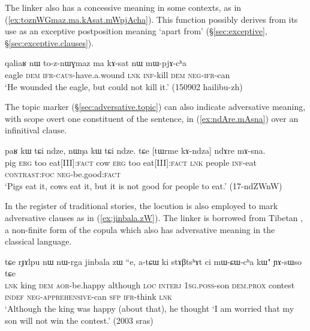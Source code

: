  The linker  also has a concessive meaning in some contexts, as in (\ref{ex:toznWGmaz.ma.kAsat.mWpjAcha}). This function possibly derives from its use as an exceptive postposition meaning `apart from' (§\ref{sec:exceptive}, §\ref{sec:exceptive.clauses}).
 
\begin{exe}
\ex \label{ex:toznWGmaz.ma.kAsat.mWpjAcha}
\gll qaliaʁ nɯ to-z-nɯɣmaz ma kɤ-sat nɯ mɯ-pjɤ-cʰa\\
eagle \textsc{dem} \textsc{ifr}-\textsc{caus}-have.a.wound \textsc{lnk} \textsc{inf}-kill \textsc{dem} \textsc{neg}-\textsc{ifr}-can\\
\glt `He wounded the eagle, but could not kill it.' (150902 hailibu-zh)
\end{exe}  
 
The topic marker  (§\ref{sec:adversative.topic}) can also indicate adversative meaning, with scope overt one constituent of the sentence, in (\ref{ex:ndAre.mAsna}) over an infinitival clause.
 
\begin{exe}
\ex \label{ex:ndAre.mAsna}
\gll paʁ kɯ tɕi ndze, nɯŋa kɯ tɕi ndze. tɕe [tɯrme kɤ-ndza] ndɤre mɤ-sna.   \\
pig \textsc{erg} too eat[III]:\textsc{fact} cow  \textsc{erg} too eat[III]:\textsc{fact} \textsc{lnk} people \textsc{inf}-eat  \textsc{contrast}:\textsc{foc}  \textsc{neg}-be.good:\textsc{fact} \\
\glt `Pigs eat it, cows eat it, but it is not good for people to eat.'  (17-ndZWnW)
\end{exe} 

In the register of traditional stories, the locution  is also employed to mark adversative clauses as in (\ref{ex:jinbala.zW}). The linker  is borrowed from Tibetan , a non-finite form of the copula  which also has adversative meaning in the classical language.

\begin{exe}
\ex \label{ex:jinbala.zW}
\gll tɕe rɟɤlpu nɯ nɯ-rga jinbala zɯ ``e, a-tɕɯ ki stɤβtsʰɤt ci mɯ-ɕɯ-cʰa kɯ" ɲɤ-sɯso tɕe \\
\textsc{lnk} king \textsc{dem} \textsc{aor}-be.happy although \textsc{loc} \textsc{interj} \textsc{1sg}.\textsc{poss}-son \textsc{dem}.\textsc{prox} contest \textsc{indef} \textsc{neg}-\textsc{apprehensive}-can \textsc{sfp} \textsc{ifr}-think \textsc{lnk} \\
\glt `Although the king was happy (about that), he thought `I am worried that my son will not win the contest.' (2003 sras)
\end{exe} 

